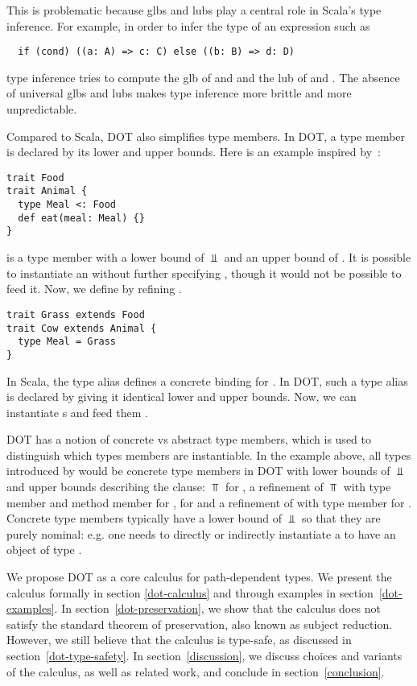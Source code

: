\documentclass[9pt]{sigplanconf}
\begin{document}
This is problematic because glbs and lubs play a central role in
Scala's type inference. For example, in order to infer the type of an
 expression such as
\begin{lstlisting}
  if (cond) ((a: A) => c: C) else ((b: B) => d: D)
\end{lstlisting}
type inference tries to compute the glb of  and  and
the lub of  and . The absence of universal glbs and
lubs makes type inference more brittle and more unpredictable.

Compared to Scala, DOT also simplifies type members. In DOT, a type
member is declared by its lower and upper bounds. Here is an example
inspired by~\cite{vt}:
\begin{lstlisting}
trait Food
trait Animal {
  type Meal <: Food
  def eat(meal: Meal) {}
}
\end{lstlisting}
 is a type member with a lower bound of $\Bot$ and an upper
bound of . It is possible to instantiate an 
without further specifying , though it would not be
possible to feed it. Now, we define  by refining
.
\begin{lstlisting}
trait Grass extends Food
trait Cow extends Animal {
  type Meal = Grass
}
\end{lstlisting}
In Scala, the type alias  defines a concrete
binding for . In DOT, such a type alias is declared by
giving it identical lower and upper bounds. Now, we can instantiate
s and feed them .

DOT has a notion of concrete vs abstract type members, which is used
to distinguish which types members are instantiable. In the example
above, all types introduced by  would be concrete type
members in DOT with lower bounds of $\Bot$ and upper bounds describing
the  clause: $\Top$ for , a refinement of
$\Top$ with type member  and method member  for
,  for  and a refinement of
 with type member  for . Concrete
type members typically have a lower bound of $\Bot$ so that they are
purely nominal: e.g. one needs to directly or indirectly instantiate a
 to have an object of type .

We propose DOT as a core calculus for path-dependent types. We present
the calculus formally in section \ref{dot-calculus} and through
examples in section~\ref{dot-examples}. In
section~\ref{dot-preservation}, we show that the calculus does not
satisfy the standard theorem of preservation, also known as subject
reduction. However, we still believe that the calculus is type-safe,
as discussed in section~\ref{dot-type-safety}. In
section~\ref{discussion}, we discuss choices and variants of the
calculus, as well as related work, and conclude in
section~\ref{conclusion}.
\end{document}
